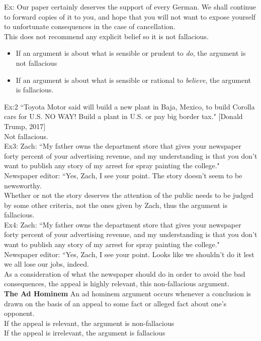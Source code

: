 \documentclass[11pt, fleqn]{article}
\begin{document}
Ex: Our paper certainly deserves the support of every German. We shall continue to forward copies of it to you, and hope that you will not want to expose yourself to unfortunate consequences in the case of cancellation.\\

This does not recommend any explicit belief so it is not fallacious.
\begin{itemize}
    \item If an argument is about what is sensible or prudent to \textit{do}, the argument is not fallacious
    \item If an argument is about what is sensible or rational to \textit{believe}, the argument is fallacious.
\end{itemize}

Ex:2 ``Toyota Motor said will build a new plant in Baja, Mexico, to build Corolla cars for U.S. NO WAY! Build a plant in U.S. or pay big border tax." [Donald Trump, 2017]\\
Not fallacious.\\

Ex3: Zach: ``My father owns the department store that gives your newspaper forty percent of your advertising revenue, and my understanding is that you don't want to publish any story of my arrest for spray painting the college."\\
Newspaper editor: ``Yes, Zach, I see your point. The story doesn't seem to be newsworthy.\\

Whether or not the story deserves the attention of the public needs to be judged by some other criteria, not the ones given by Zach, thus the argument is fallacious.\\

Ex4: Zach: ``My father owns the department store that gives your newspaper forty percent of your advertising revenue, and my understanding is that you don't want to publish any story of my arrest for spray painting the college."\\
Newspaper editor: ``Yes, Zach, I see your point. Looks like we shouldn't do it lest we all lose our jobs, indeed.\\

As a consideration of what the newspaper should do in order to avoid the bad consequences, the appeal is highly relevant, this non-fallacious argument.\\

\textbf{The Ad Hominem}
An ad hominem argument occurs whenever a conclusion is drawn on the basis of an appeal to some fact or alleged fact about one's opponent.\\
If the appeal is relevant, the argument is non-fallacious\\
If the appeal is irrelevant, the argument is fallacious\\
\end{document}
